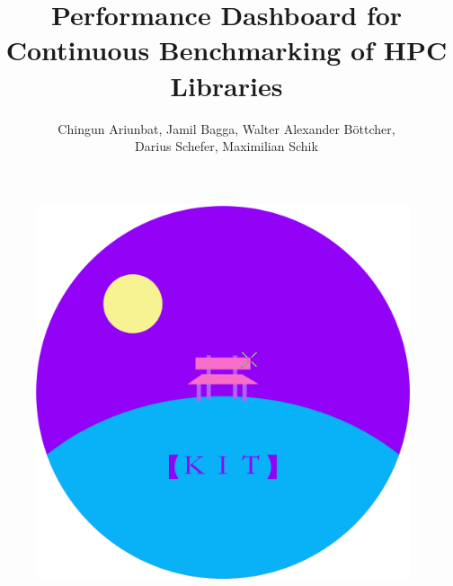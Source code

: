 \documentclass[parskip=full,11pt]{scrartcl}
\title{Performance Dashboard for Continuous Benchmarking of HPC Libraries}
\author{Chingun Ariunbat, Jamil Bagga, Walter Alexander B\"ottcher,\\Darius Schefer, Maximilian Schik}
\begin{document}
\maketitle
\begin{figure}[h]
	\includegraphics[width=11cm]{vapor.png}
	\centering	
\end{figure}

\clearpage

\tableofcontents
\clearpage




\clearpage


\clearpage


\clearpage


\clearpage


\clearpage


\clearpage


\clearpage

\appendix

\printnoidxglossaries
\end{document}
